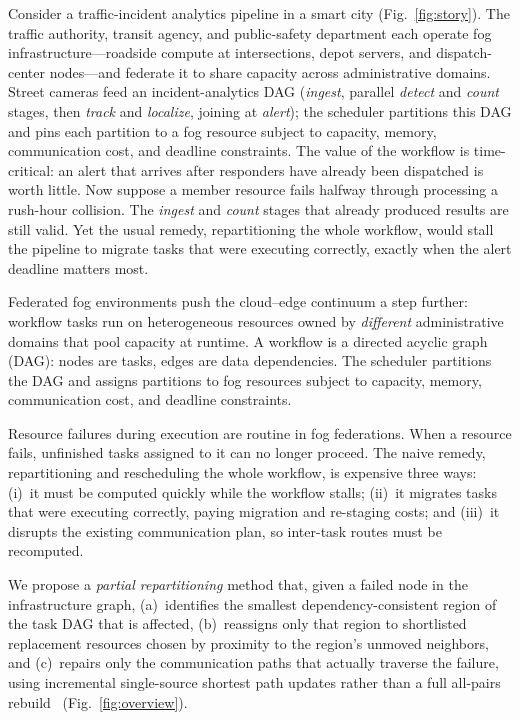 \documentclass[conference]{IEEEtran}
\theoremstyle{remark}
\begin{document}
Consider a traffic-incident analytics pipeline in a smart city
(Fig.~\ref{fig:story}). The traffic authority, transit agency, and
public-safety department each operate fog infrastructure---roadside
compute at intersections, depot servers, and dispatch-center
nodes---and federate it to share capacity across administrative
domains. Street cameras feed an incident-analytics DAG
(\emph{ingest}, parallel \emph{detect} and \emph{count} stages, then
\emph{track} and \emph{localize}, joining at \emph{alert}); the
scheduler partitions this DAG and pins each partition to a fog resource
subject to capacity, memory, communication cost, and deadline
constraints. The value of the workflow is time-critical: an alert that
arrives after responders have already been dispatched is worth little.
Now suppose a member resource fails halfway through processing a
rush-hour collision. The \emph{ingest} and \emph{count} stages that
already produced results are still valid. Yet the usual remedy,
repartitioning the whole workflow, would stall the pipeline to migrate
tasks that were executing correctly, exactly when the alert deadline
matters most.

Federated fog environments push the cloud--edge continuum a step
further: workflow tasks run on heterogeneous resources owned by
\emph{different} administrative domains that pool capacity at runtime.
A workflow is a directed
acyclic graph (DAG): nodes are tasks, edges are data dependencies. The
scheduler partitions the DAG and assigns partitions to fog resources subject
to capacity, memory, communication cost, and deadline constraints.

Resource failures during execution are routine in fog federations. When a
resource fails, unfinished tasks assigned to it can no longer proceed. The
naive remedy, repartitioning and rescheduling the whole workflow, is
expensive three ways: (i)~it must be computed quickly while the workflow
stalls; (ii)~it migrates tasks that were executing correctly, paying
migration and re-staging costs; and (iii)~it disrupts the existing
communication plan, so inter-task routes must be recomputed.

We propose a \emph{partial repartitioning} method that, given a failed node
in the infrastructure graph, (a)~identifies the smallest
dependency-consistent region of the task DAG that is affected, (b)~reassigns
only that region to shortlisted replacement resources chosen by proximity to
the region's unmoved neighbors, and (c)~repairs only the communication paths
that actually traverse the failure, using incremental single-source shortest
path updates rather than a full all-pairs rebuild~\cite{bhowmick2019}
(Fig.~\ref{fig:overview}).
\end{document}

